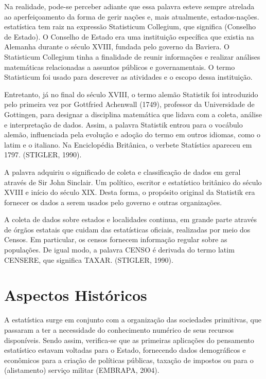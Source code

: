 \documentclass[
  letterpaper,
  DIV=11,
  numbers=noendperiod]{scrreprt}
\begin{document}
Na realidade, pode-se perceber adiante que essa palavra esteve sempre
atrelada ao aperfeiçoamento da forma de gerir nações e, mais atualmente,
estados-nações. estatística tem raiz na expressão Statisticum Collegium,
que significa (Conselho de Estado). O Conselho de Estado era uma
instituição específica que existia na Alemanha durante o século XVIII,
fundada pelo governo da Baviera. O Statisticum Collegium tinha a
finalidade de reunir informações e realizar análises matemáticas
relacionadas a assuntos públicos e governamentais. O termo Statisticum
foi usado para descrever as atividades e o escopo dessa instituição.

Entretanto, já no final do século XVIII, o termo alemão Statistik foi
introduzido pelo primeira vez por Gottfried Achenwall (1749), professor
da Universidade de Gottingen, para designar a disciplina matemática que
lidava com a coleta, análise e interpretação de dados. Assim, a palavra
Statistik entrou para o vocábulo alemão, influenciada pela evolução e
adoção do termo em outros idiomas, como o latim e o italiano. Na
Enciclopédia Britânica, o verbete Statístics apareceu em 1797. (STIGLER,
1990).

A palavra adquiriu o significado de coleta e classificação de dados em
geral através de Sir John Sinclair. Um político, escritor e estatístico
britânico do século XVIII e início do século XIX. Desta forma, o
propósito original da Statistik era fornecer os dados a serem usados
pelo governo e outras organizações.

A coleta de dados sobre estados e localidades continua, em grande parte
através de órgãos estatais que cuidam das estatísticas oficiais,
realizadas por meio dos Censos. Em particular, os censos fornecem
informação regular sobre as populações. De igual modo, a palavra CENSO é
derivada do termo latim CENSERE, que significa TAXAR. (STIGLER, 1990).

\hypertarget{aspectos-histuxf3ricos}{%
\section{Aspectos Históricos}\label{aspectos-histuxf3ricos}}

A estatística surge em conjunto com a organização das sociedades
primitivas, que passaram a ter a necessidade do conhecimento numérico de
seus recursos disponíveis. Sendo assim, verifica-se que as primeiras
aplicações do pensamento estatístico estavam voltadas para o Estado,
fornecendo dados demográficos e econômicos para a criação de políticas
públicas, taxação de impostos ou para o (alistamento) serviço militar
(EMBRAPA, 2004).
\end{document}
